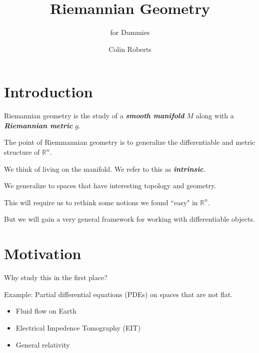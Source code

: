 \documentclass[UKenglish]{beamer}
\author{Colin Roberts}
\title{Riemannian Geometry}
\subtitle{for Dummies}
\newcommand\boldgreen[1]{\textcolor{lighter_csu_green}{\emph{\textbf{#1}}}}
\newcommand{\R}{\mathbb{R}}
\begin{document}
\section{Introduction}

\begin{frame}{}
	\vfill
	\large{Riemannian geometry} is the study of a \boldgreen{smooth manifold} $M$ along with a \boldgreen{Riemannian metric} $g$. 
	\vfill
\end{frame}

\begin{frame}{}
	\vfill
	The point of Riemmannian geometry is to generalize the differentiable and metric structure of $\R^n$.
	\vfill
\end{frame}

\begin{frame}{}
	\vfill
	We think of living on the manifold. We refer to this as \boldgreen{intrinsic}.
	\vfill
\end{frame}

\begin{frame}{}
	\vfill
	We generalize to spaces that have interesting topology and geometry.
	\vfill
\end{frame}

\begin{frame}{}
	\vfill
	This will require us to rethink some notions we found ``easy" in $\R^n$.
	\vfill
\end{frame}

\begin{frame}{}
	\vfill
	But we will gain a very general framework for working with differentiable objects.
	\vfill
\end{frame}

\section{Motivation}

\begin{frame}{}
	\vfill
	Why study this in the first place?
	\vfill
\end{frame}

\begin{frame}{}
	\vfill
	Example: Partial differential equations (PDEs) on spaces that are not flat.
	\pause
	\begin{itemize}
		\item Fluid flow on Earth
		\pause
		\item Electrical Impedence Tomography (EIT)
		\pause
		\item General relativity
	\end{itemize}
	\vfill
\end{frame}
\end{document}
